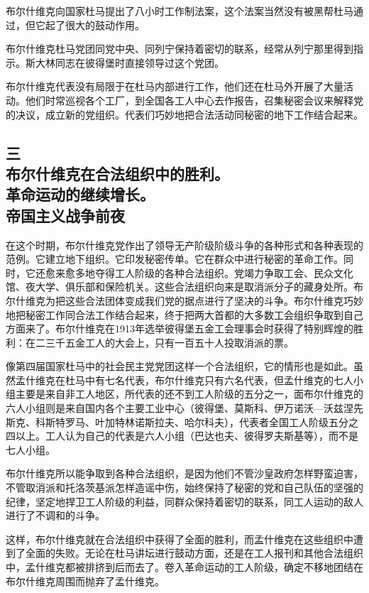 布尔什维克向国家杜马提出了八小时工作制法案，这个法案当然没有被黑帮杜马通过，但它起了很大的鼓动作用。

布尔什维克杜马党团同党中央、同列宁保持着密切的联系，经常从列宁那里得到指示。斯大林同志在彼得堡时直接领导过这个党团。

布尔什维克代表没有局限于在杜马内部进行工作，他们还在杜马外开展了大量活动。他们时常巡视各个工厂，到全国各工人中心去作报告，召集秘密会议来解释党的决议，成立新的党组织。代表们巧妙地把合法活动同秘密的地下工作结合起来。


\subsection[三\q 布尔什维克在合法组织中的胜利。革命运动的继续增长。帝国主义战争前夜]{三\\布尔什维克在合法组织中的胜利。\\革命运动的继续增长。\\帝国主义战争前夜}

在这个时期，布尔什维克党作出了领导无产阶级阶级斗争的各种形式和各种表现的范例。它建立地下组织。它印发秘密传单。它在群众中进行秘密的革命工作。同时，它还愈来愈多地夺得工人阶级的各种合法组织。党竭力争取工会、民众文化馆、夜大学、俱乐部和保险机关。这些合法组织向来是取消派分子的藏身处所。布尔什维克为把这些合法团体变成我们党的据点进行了坚决的斗争。布尔什维克巧妙地把秘密工作同合法工作结合起来，终于把两大首都的大多数工会组织争取到自己方面来了。布尔什维克在1913年选举彼得堡五金工会理事会时获得了特别辉煌的胜利：在二三千五金工人的大会上，只有一百五十人投取消派的票。

像第四届国家杜马中的社会民主党党团这样一个合法组织，它的情形也是如此。虽然孟什维克在杜马中有七名代表，布尔什维克只有六名代表，但孟什维克的七人小组主要是来自非工人地区，所代表的还不到工人阶级的五分之一，面布尔什维克的六人小组则是来自国内各个主要工业中心（彼得堡、莫斯科、伊万诺沃—沃兹涅先斯克、科斯特罗马、叶加特林诺斯拉夫、哈尔科夫），代表者全国工人阶级五分之四以上。工人认为自己的代表是六人小组（巴达也夫、彼得罗夫斯基等），而不是七人小组。

布尔什维克所以能争取到各种合法组织，是因为他们不管沙皇政府怎样野蛮迫害，不管取消派和托洛茨基派怎样造谣中伤，始终保持了秘密的党和自己队伍的坚强的纪律，坚定地捍卫工人阶级的利益，同群众保持着密切的联系，同工人运动的敌人进行了不调和的斗争。

这样，布尔什维克就在合法组织中获得了全面的胜利，而孟什维克在这些组织中遭到了全面的失败。无论在杜马讲坛进行鼓动方面，还是在工人报刊和其他合法组织中，孟什维克都被排挤到后而去了。卷入革命运动的工人阶级，确定不移地团结在布尔什维克周围而抛弃了孟什维克。

